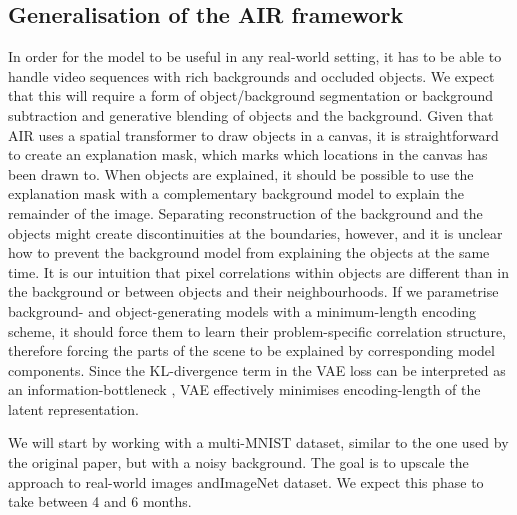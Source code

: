     \subsection{Generalisation of the AIR framework}
        In order for the model to be useful in any real-world setting, it has to be able to handle video sequences with rich backgrounds and occluded objects. 
        We expect that this will require a form of object/background segmentation or background subtraction and generative blending of objects and the background.  
        Given that AIR uses a spatial transformer \citep{Jaderberg2015} to draw objects in a canvas, it is straightforward to create an explanation mask, which marks which locations in the canvas has been drawn to. 
        When objects are explained, it should be possible to use the explanation mask with a complementary background model to explain the remainder of the image.
        Separating reconstruction of the background and the objects might create discontinuities at the boundaries, however, and it is unclear how to prevent the background model from explaining the objects at the same time.
        It is our intuition that pixel correlations within objects are different than in the background or between objects and their neighbourhoods.
        If we parametrise background- and object-generating models with a minimum-length encoding scheme, it should force them to learn their problem-specific correlation structure, therefore forcing the parts of the scene to be explained by corresponding model components.
        Since the KL-divergence term in the VAE loss can be interpreted as an information-bottleneck \citep{Achille2016}, VAE effectively minimises encoding-length of the latent representation.
        
        We will start by working with a multi-MNIST dataset, similar to the one used by the original paper, but with a noisy background. 
        The goal is to upscale the approach to real-world images and\eg ImageNet dataset. 
        We expect this phase to take between 4 and 6 months.
    
